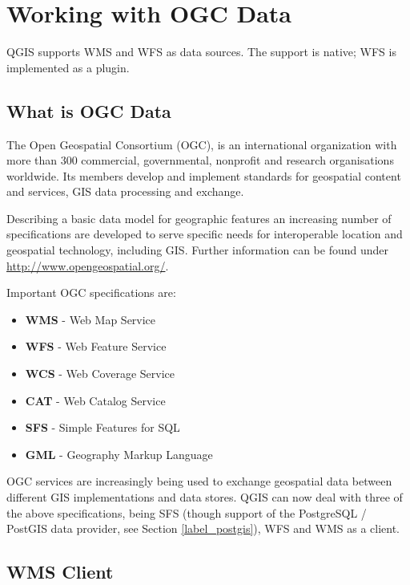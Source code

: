 
\section{Working with OGC Data}


QGIS supports WMS and WFS as data sources. The support is native; WFS is
implemented as a plugin.

\subsection{What is OGC Data}

The Open Geospatial Consortium (OGC), is an international organization with more than 300 
commercial, governmental, nonprofit and research organisations worldwide. Its members 
develop and implement standards for geospatial content and services, GIS data processing 
and exchange.

Describing a basic data model for geographic features an increasing number of specifications 
are developed to serve specific needs for interoperable location and geospatial technology, 
including GIS. Further information can be found under \url{http://www.opengeospatial.org/}.

Important OGC specifications are:

\begin{itemize}
\item \textbf{WMS} - Web Map Service
\item \textbf{WFS} - Web Feature Service
\item \textbf{WCS} - Web Coverage Service
\item \textbf{CAT} - Web Catalog Service
\item \textbf{SFS} - Simple Features for SQL
\item \textbf{GML} - Geography Markup Language
\end{itemize}

OGC services are increasingly being used to exchange geospatial data between
different GIS implementations and data stores.  QGIS can now deal with three of the
above specifications, being SFS (though support of the PostgreSQL / PostGIS
data provider, see Section \ref{label_postgis}), WFS and WMS as a client.

\subsection{WMS Client}\label{sec:ogc-wms}

